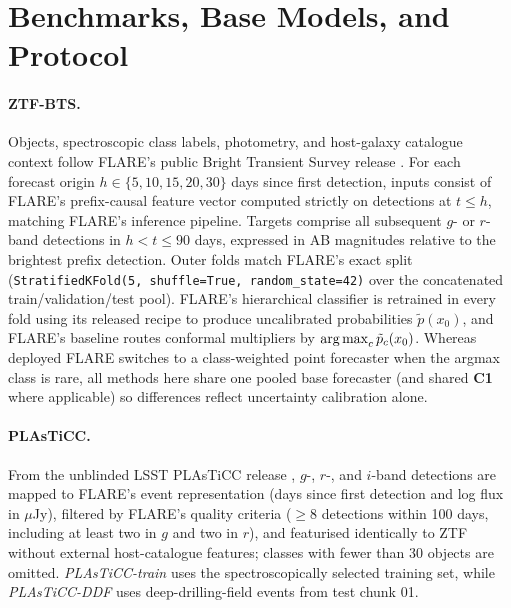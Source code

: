

\FloatBarrier
\section{Benchmarks, Base Models, and Protocol}
\label{app:protocol}


\paragraph{ZTF-BTS.}
Objects, spectroscopic class labels, photometry, and host-galaxy catalogue context follow FLARE's public Bright Transient Survey release \citep{sasli2026forecast,sasli2026flare}.
For each forecast origin $h\in\{5,10,15,20,30\}$ days since first detection, inputs consist of FLARE's prefix-causal feature vector computed strictly on detections at $t\le h$, matching FLARE's inference pipeline.
Targets comprise all subsequent $g$- or $r$-band detections in $h<t\le90$ days, expressed in AB magnitudes relative to the brightest prefix detection.
Outer folds match FLARE's exact split (\texttt{StratifiedKFold(5, shuffle=True, random\_state=42)} over the concatenated train/validation/test pool).
FLARE's hierarchical classifier is retrained in every fold using its released recipe to produce uncalibrated probabilities $\tilde p(x_0)$, and FLARE's baseline routes conformal multipliers by $\operatorname*{arg\,max}_c \tilde p_c(x_0)$.
Whereas deployed FLARE switches to a class-weighted point forecaster when the argmax class is rare, all methods here share one pooled base forecaster (and shared \textbf{C1} where applicable) so differences reflect uncertainty calibration alone.

\paragraph{PLAsTiCC.}
From the unblinded LSST PLAsTiCC release \citep{kessler2019models,hlozek2023results}, $g$-, $r$-, and $i$-band detections are mapped to FLARE's event representation (days since first detection and log flux in $\mu$Jy), filtered by FLARE's quality criteria ($\ge8$ detections within 100 days, including at least two in $g$ and two in $r$), and featurised identically to ZTF without external host-catalogue features; classes with fewer than 30 objects are omitted.
\emph{PLAsTiCC-train} uses the spectroscopically selected training set, while \emph{PLAsTiCC-DDF} uses deep-drilling-field events from test chunk 01.

